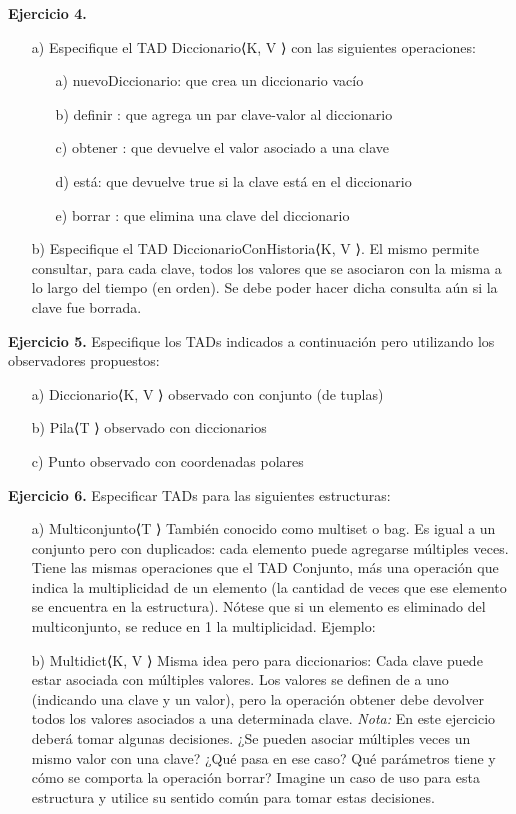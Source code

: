 \documentclass{article}
\begin{document}
\textbf{Ejercicio 4.}
\begin{itemize}
    \item [a)] Especifique el TAD Diccionario⟨K, V ⟩ con las siguientes operaciones:
    \begin{itemize}
        \item [a)] nuevoDiccionario: que crea un diccionario vac\'io
        \item [b)] definir : que agrega un par clave-valor al diccionario
        \item [c)] obtener : que devuelve el valor asociado a una clave
        \item [d)] est\'a: que devuelve true si la clave est\'a en el diccionario
        \item [e)] borrar : que elimina una clave del diccionario
    \end{itemize}
    \item [b)] Especifique el TAD DiccionarioConHistoria⟨K, V ⟩. El mismo permite consultar, para cada clave, todos los valores que se
    asociaron con la misma a lo largo del tiempo (en orden). Se debe poder hacer dicha consulta a\'un si la clave fue borrada.
\end{itemize}

\textbf{Ejercicio 5.} Especifique los TADs indicados a continuaci\'on pero utilizando los observadores propuestos:
\begin{itemize}
    \item [a)] Diccionario⟨K, V ⟩ observado con conjunto (de tuplas)
    \item [b)] Pila⟨T ⟩ observado con diccionarios
    \item [c)] Punto observado con coordenadas polares
\end{itemize}

\textbf{Ejercicio 6.} Especificar TADs para las siguientes estructuras:
\begin{itemize}
    \item [a)] Multiconjunto⟨T ⟩
    Tambi\'en conocido como multiset o bag. Es igual a un conjunto pero con duplicados: cada elemento puede agregarse
    m\'ultiples veces. Tiene las mismas operaciones que el TAD Conjunto, m\'as una operaci\'on que indica la multiplicidad de
    un elemento (la cantidad de veces que ese elemento se encuentra en la estructura). N\'otese que si un elemento es eliminado
    del multiconjunto, se reduce en 1 la multiplicidad. Ejemplo:
    \item [b)] Multidict⟨K, V ⟩
    Misma idea pero para diccionarios: Cada clave puede estar asociada con m\'ultiples valores. Los valores se definen de a uno
    (indicando una clave y un valor), pero la operaci\'on obtener debe devolver todos los valores asociados a una determinada
    clave.
    \textit{Nota:} En este ejercicio deber\'a tomar algunas decisiones. ¿Se pueden asociar m\'ultiples veces un mismo valor con una clave? ¿Qu\'e pasa en ese caso? Qu\'e par\'ametros tiene y c\'omo se comporta la operaci\'on borrar? Imagine un caso de uso para esta estructura y utilice su sentido com\'un para tomar estas decisiones.
\end{itemize}
\end{document}
